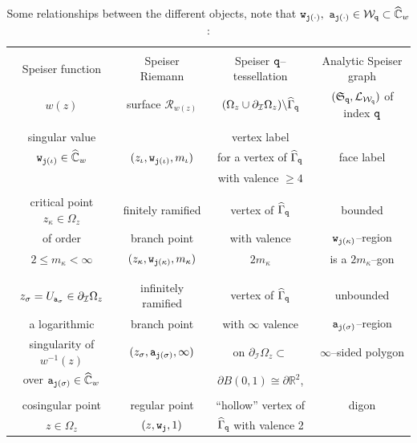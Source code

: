 \documentclass[final,3p,times]{elsarticle}
\newcommand{\CW}{\ensuremath{{\widehat{\mathbb C}}}}
\newcommand{\RR}{\ensuremath{{\mathbb R}}}
\newcommand{\R}{\ensuremath{{\mathcal R}}}
\theoremstyle{definition}
\begin{document}
\begin{table}[htp]
\caption{Some relationships between the different objects, 
note that
${\tt w}_{{\tt j}(\cdot )}, \ {\tt a}_{{\tt j}(\cdot )} 
\in \mathcal{W}_{\tt q} 
\subset \CW_w $:
}
\begin{center}
\begin{tabular}{|c|c|c|c|}
\hline
&&& \vspace{-.3cm}
\\
Speiser function & Speiser Riemann & Speiser $\tt q$--tessellation & Analytic Speiser graph 
\\
$w(z)$ & surface $\R_{w(z)}$ & $ (\Omega_z \cup \partial_{\mathcal{I}} \Omega_z )\backslash \widehat{\Gamma}_{\tt q}$ & $(\mathfrak{S}_{\tt q}, \mathcal{L}_{\mathcal{W}_{\tt q}} )$ of index $\tt q$ 
\\
&&& \vspace{-.3cm}
\\
\hline
\hline
singular value & & vertex label & 
 \\
${\tt w}_{{\tt j}(\iota)} \in \CW_w$ & $(z_\iota, {\tt w}_{{\tt j}(\iota)}, m_{\iota} )$ & for a vertex of $\widehat{\Gamma}_{\tt q}$ & face label 
\\
 & & with valence $\geq 4$ & 
\\
\hline
&&& \vspace{-.35cm}
\\
critical point $z_\kappa \in \Omega_z$ & finitely ramified  & vertex of $\widehat{\Gamma}_{\tt q}$ & bounded  
\\
of order 
& branch point & with valence & $\tt w_{{\tt j}(\kappa)}$--region 
\\
$2\leq m_\kappa < \infty$ 
& $(z_\kappa, {\tt w}_{{\tt j}(\kappa)}, m_{\kappa} )$ & $2 m_{\kappa}$ & is a $2 m_{\kappa}$--gon
\\ 
&&& \vspace{-.35cm}
\\
\hline
&&&  \vspace{-.35cm}
\\
$z_\sigma = U_{{\tt a}_\sigma} \in \partial_{\mathcal{I}} \Omega_z$ & infinitely ramified & vertex of $\widehat{\Gamma}_{\tt q}$ & unbounded  \\
a logarithmic & branch point & with $\infty$ valence & ${\tt a}_{{\tt j}(\sigma)}$--region \\
singularity of $w^{-1}(z)$ & $(z_\sigma, {\tt a}_{{\tt j}(\sigma)}, \infty )$ & on $\partial_\mathcal{I} \Omega_z \subset$ & $\infty$--sided polygon \\
over ${\tt a}_{{\tt j}(\sigma)} \in \CW_w$ &  & $\partial B(0,1)\cong \partial \RR^2$,& 
\\
&&& \vspace{-.35cm}
\\
\hline
cosingular point & regular point & ``hollow'' vertex of & digon 
\\
$z \in \Omega_z$  & $(z, {\tt w}_{{\tt j}}, 1 )$
 & $\widehat{\Gamma}_{\tt q}$ with valence 2 &
\\ 
\hline
\end{tabular}
\end{center}
\label{table:tabla-relaciones}
\end{table}%
\end{document}
